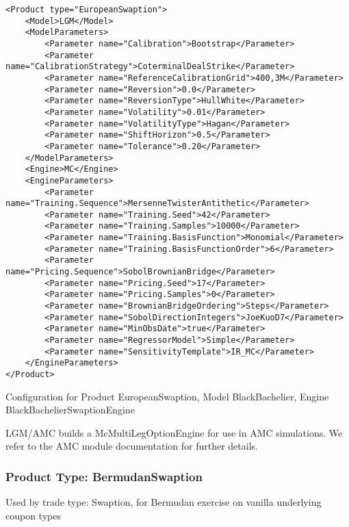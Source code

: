 \begin{longlisting}
\begin{verbatim}
<Product type="EuropeanSwaption">
    <Model>LGM</Model>
    <ModelParameters>
        <Parameter name="Calibration">Bootstrap</Parameter>
        <Parameter name="CalibrationStrategy">CoterminalDealStrike</Parameter>
        <Parameter name="ReferenceCalibrationGrid">400,3M</Parameter>
        <Parameter name="Reversion">0.0</Parameter>
        <Parameter name="ReversionType">HullWhite</Parameter>
        <Parameter name="Volatility">0.01</Parameter>
        <Parameter name="VolatilityType">Hagan</Parameter>
        <Parameter name="ShiftHorizon">0.5</Parameter>
        <Parameter name="Tolerance">0.20</Parameter>
    </ModelParameters>
    <Engine>MC</Engine>
    <EngineParameters>
        <Parameter name="Training.Sequence">MersenneTwisterAntithetic</Parameter>
        <Parameter name="Training.Seed">42</Parameter>
        <Parameter name="Training.Samples">10000</Parameter>
        <Parameter name="Training.BasisFunction">Monomial</Parameter>
        <Parameter name="Training.BasisFunctionOrder">6</Parameter>
        <Parameter name="Pricing.Sequence">SobolBrownianBridge</Parameter>
        <Parameter name="Pricing.Seed">17</Parameter>
        <Parameter name="Pricing.Samples">0</Parameter>
        <Parameter name="BrownianBridgeOrdering">Steps</Parameter>
        <Parameter name="SobolDirectionIntegers">JoeKuoD7</Parameter>
        <Parameter name="MinObsDate">true</Parameter>
        <Parameter name="RegressorModel">Simple</Parameter>
        <Parameter name="SensitivityTemplate">IR_MC</Parameter>
    </EngineParameters>
</Product>
\end{verbatim}
\caption{Configuration for Product EuropeanSwaption, Model BlackBachelier, Engine BlackBachelierSwaptionEngine}
\label{lst:peconfig_EuropeanSwaption_LGM_MC}
\end{longlisting}

LGM/AMC builds a McMultiLegOptionEngine for use in AMC simulations. We refer to the AMC module documentation for further
details.

\subsubsection{Product Type: BermudanSwaption}

Used by trade type: Swaption, for Bermudan exercise on vanilla underlying coupon types

